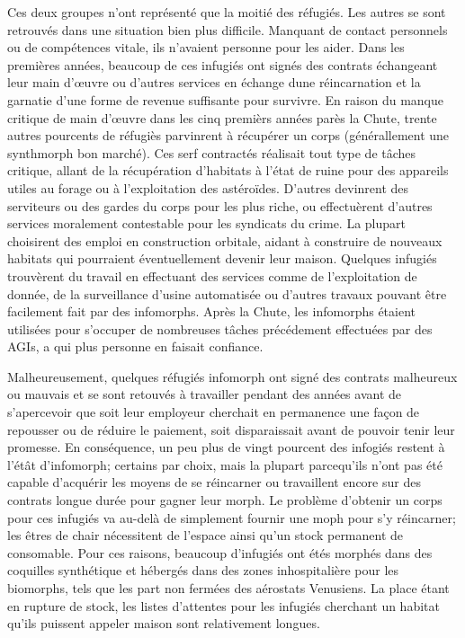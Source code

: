               Ces deux groupes n'ont représenté que la moitié des réfugiés. Les autres se sont retrouvés dans une situation bien plus difficile. Manquant de contact personnels ou de compétences vitale, ils n'avaient personne pour les aider. Dans les premières années, beaucoup de ces infugiés ont signés des contrats échangeant leur main  d'œuvre ou d'autres services en échange dune réincarnation et la garnatie d'une forme de revenue suffisante pour survivre. En raison du manque critique de main d'œuvre dans les cinq premièrs années parès la Chute, trente autres pourcents de réfugiès parvinrent à récupérer un corps (générallement une synthmorph bon marché). Ces serf contractés réalisait tout type de tâches critique, allant de la récupération d'habitats à l'état de ruine pour des appareils utiles au forage ou à l'exploitation des astéroïdes. D'autres devinrent des serviteurs ou des gardes du corps pour les plus riche, ou effectuèrent d'autres services moralement contestable pour les syndicats du crime. La plupart choisirent des emploi en construction orbitale, aidant à construire de nouveaux habitats qui pourraient éventuellement devenir leur maison. Quelques infugiés trouvèrent du travail en effectuant des services comme de l'exploitation de donnée, de la surveillance d'usine automatisée ou d'autres travaux pouvant être facilement fait par des infomorphs. Après la Chute, les infomorphs étaient utilisées pour s'occuper de nombreuses tâches précédement effectuées par des AGIs, a qui plus personne en faisait confiance. 

               Malheureusement, quelques réfugiés infomorph ont signé des contrats malheureux ou mauvais et se sont retouvés à travailler pendant des années avant de s'apercevoir que soit leur employeur cherchait en permanence une façon de repousser ou de réduire le paiement, soit disparaissait avant de pouvoir tenir leur promesse. En conséquence, un peu plus de vingt pourcent des infogiés restent à l'étât d'infomorph; certains par choix, mais la plupart parcequ'ils n'ont pas été capable d'acquérir les moyens de se réincarner ou travaillent encore sur des contrats longue durée pour gagner leur morph. Le problème d'obtenir un corps pour ces infugiés va au-delà de simplement fournir une moph pour s'y réincarner; les êtres de chair nécessitent de l'espace ainsi qu'un stock permanent de consomable. Pour ces raisons, beaucoup d'infugiés ont étés morphés dans des coquilles synthétique et hébergés dans des zones inhospitalière pour les biomorphs, tels que les part non fermées des aérostats Venusiens. La place étant en rupture de stock, les listes d'attentes pour les infugiés cherchant un habitat qu'ils puissent appeler maison sont relativement longues. 


